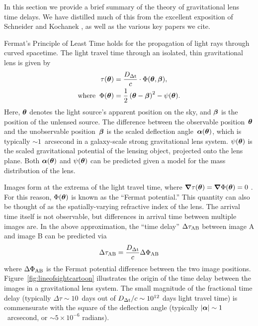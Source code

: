
In this section we provide a brief summary of the theory of
gravitational lens time delays. We have distilled much of this from the
excellent exposition of Schneider and Kochanek \citep{SKW06}, as well as
the various key papers we cite.


Fermat's Principle of Least Time holds for the propagation of light rays
through curved spacetime. The light travel time through an isolated, thin
gravitational lens is given by
\begin{align}
    \tau(\boldsymbol{\theta}) &= \frac{D_{\Delta{\rm t}}}{c} \cdot \Phi(\boldsymbol{\theta},\boldsymbol{\beta}), \\
    \text{where\;\;} \Phi(\boldsymbol{\theta}) &= \frac{1}{2}\left(\boldsymbol{\theta} - \boldsymbol{\beta}\right)^2 - \psi(\boldsymbol{\theta}).
\end{align}
Here, $\boldsymbol{\theta}$ denotes the light source's apparent position on the sky, and
$\boldsymbol{\beta}$ is the position of the unlensed source. The difference between the
observable position~$\boldsymbol{\theta}$ and the unobservable position~$\boldsymbol{\beta}$ is the
scaled deflection angle~$\boldsymbol{\alpha}({\boldsymbol{\theta}})$, which is typically
$\sim1$~arcsecond in a galaxy-scale strong gravitational lens system.
$\psi(\boldsymbol{\theta})$ is the scaled gravitational potential of the lensing object,
projected onto the lens plane. Both $\boldsymbol{\alpha}(\boldsymbol{\theta})$ and $\psi(\boldsymbol{\theta})$ can be
predicted given a model for the mass distribution of the lens.

Images form at the extrema of the light travel time, where $\boldsymbol{\nabla}
\tau(\boldsymbol{\theta}) = \boldsymbol{\nabla} \Phi(\boldsymbol{\theta}) = 0$ \citep{Schneider1985}. For this reason,
$\Phi(\boldsymbol{\theta})$ is known as the ``Fermat potential.'' This quantity can also
be thought of as the spatially-varying refractive index of the lens. The
arrival time itself is not observable, but differences in arrival time
between multiple images are. In the above approximation, the  ``time delay'' $\Delta \tau_{\rm AB}$
between image A and
image B can be predicted via
\begin{equation}
    \Delta \tau_{\rm AB} = \frac{D_{\Delta{\rm t}}}{c} \Delta \Phi_{\rm AB} \label{eq:timedelay}
\end{equation}
where $\Delta \Phi_{\rm AB}$ is the Fermat potential difference between the
two image positions.
Figure~\ref{fig:lineofsightcartoon} illustrates the origin of the
time delay between the images in a gravitational lens system. The small
magnitude of the fractional time delay (typically $\Delta\tau \sim 10$~days out of
$D_{\Delta{\rm t}}/c \sim 10^{12}$ days light travel time)
is commensurate with the square of the
deflection angle (typically $|\boldsymbol{\alpha}|\sim1$~arcsecond, or $\sim 5\times10^{-6}$
radians).

